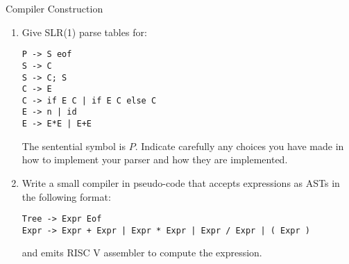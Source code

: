 \documentclass{tripos}  %
\begin{document}
\begin{question}[MockIB,year=2024,paper=2,question=8,author=rrw]{Compiler Construction}



\begin{enumerate}
\item Give SLR(1) parse tables for:
\begin{verbatim}
P -> S eof
S -> C
S -> C; S
C -> E
C -> if E C | if E C else C
E -> n | id
E -> E*E | E+E
\end{verbatim}

The sentential symbol is $P$. Indicate carefully any choices you have made in how to implement your parser and how they are implemented.

\item Write a small compiler in pseudo-code that accepts expressions as ASTs in the following format:

\begin{verbatim}
Tree -> Expr Eof
Expr -> Expr + Expr | Expr * Expr | Expr / Expr | ( Expr )
\end{verbatim}

and emits RISC V assembler to compute the expression. 
 \end{enumerate}


\end{question}
\end{document}
